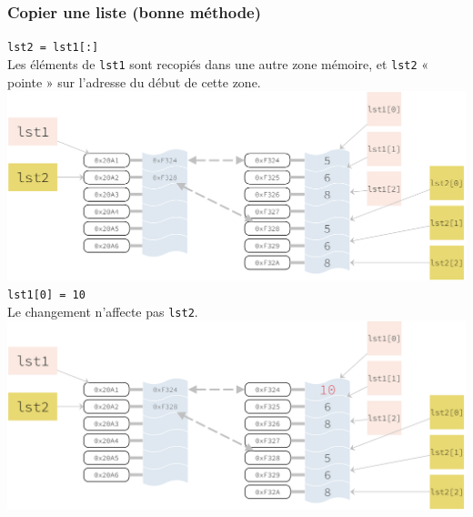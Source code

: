 \subsubsection{Copier une liste (bonne méthode)}



\texttt{lst2 = lst1[:]}\\

Les éléments de \texttt{lst1} sont recopiés dans une autre zone mémoire, et \texttt{lst2} « pointe » sur l'adresse du début de cette zone.\\  
\includegraphics[width=\linewidth]{ch-listes/img/mut4.png}\\


\texttt{lst1[0] = 10}\\

Le changement n'affecte pas \texttt{lst2}.\\ 
\includegraphics[width=\linewidth]{ch-listes/img/mut5.png}